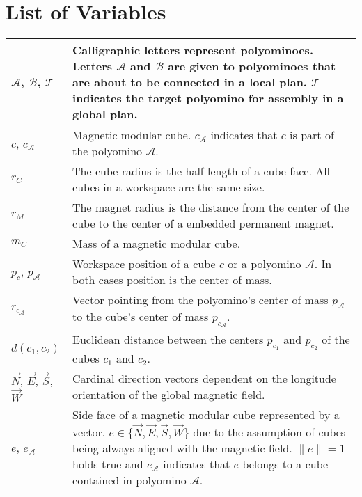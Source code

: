 \chapter*{List of Variables}

\begin{xltabular}{\textwidth}{ l  X }
	\toprule
	
	$\mathcal{A}$, $\mathcal{B}$, $\mathcal{T}$
	&
	Calligraphic letters represent polyominoes.
	Letters $\mathcal{A}$ and $\mathcal{B}$ are given to polyominoes that are about to be connected in a local plan.
	$\mathcal{T}$ indicates the target polyomino for assembly in a global plan.
	\\ \midrule
	
	$c$, $c_\mathcal{A}$
	&
	Magnetic modular cube. $c_\mathcal{A}$ indicates that $c$ is part of the polyomino $\mathcal{A}$.
	\\ \midrule
	
	$r_C$
	&
	The cube radius is the half length of a cube face.
	All cubes in a workspace are the same size.
	\\ \midrule
	
	$r_M$
	&
	The magnet radius is the distance from the center of the cube to the center of a embedded permanent magnet.
	\\ \midrule
	
	$m_C$
	&
	Mass of a magnetic modular cube.
	\\ \midrule
	
	$p_c$, $p_\mathcal{A}$ 
	&
	Workspace position of a cube $c$ or a polyomino $\mathcal{A}$.
	In both cases position is the center of mass.
	\\ \midrule
	
	$r_{c_\mathcal{A}}$  
	&
	Vector pointing from the polyomino's center of mass $p_\mathcal{A}$ to the cube's center of mass $p_{c_\mathcal{A}}$. 
	\\ \midrule
	
	$d(c_1, c_2)$  
	&
	Euclidean distance between the centers $p_{c_1}$ and $p_{c_2}$ of the cubes $c_1$ and $c_2$.
	\\ \midrule
	
	$\vec{N}$, $\vec{E}$, $\vec{S}$, $\vec{W}$
	&
	Cardinal direction vectors dependent on the longitude orientation of the global magnetic field.
	\\ \midrule
	
	$e$, $e_\mathcal{A}$
	&
	Side face of a magnetic modular cube represented by a vector.
	$e \in \{ \vec{N},\vec{E},\vec{S},\vec{W}\}$ due to the assumption of cubes being always aligned with the magnetic field. 
	$\lVert e \rVert = 1$ holds true and $e_\mathcal{A}$ indicates that $e$ belongs to a cube contained in polyomino $\mathcal{A}$.
	\\ \midrule
	

\end{xltabular}
